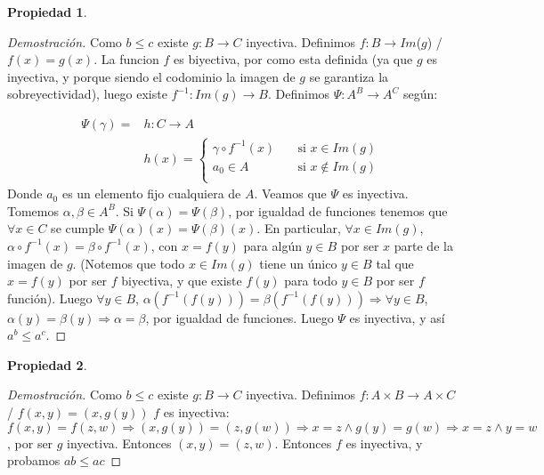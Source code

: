 \documentclass{article}
\newtheorem*{propiedad}{Propiedad}
\begin{document}
\begin{propiedad}
\end{propiedad}
\begin{proof}[Demostración]

Como $b \le c$ existe $g: B \rightarrow C$ inyectiva. \newline Definimos $f: B \rightarrow Im$($g$) / $f(x) = g(x)$. La funcion $f$ es biyectiva, por como esta definida (ya que $g$ es inyectiva, y porque siendo el codominio la imagen de $g$ se garantiza la sobreyectividad), luego existe $f^{-1}: Im(g) \rightarrow B$.  Definimos $\Psi : A^B \rightarrow A^C$ según:

\begin{align*}
\Psi(\gamma) =& h: C \rightarrow A \\
& h(x) = \begin{cases}
    \gamma \circ f^{-1}(x)       & \quad \text{si } x \in Im(g)\\
    a_0 \in A  & \quad \text{si } x \notin Im(g)\\
  \end{cases}
\end{align*}
Donde $a_0$ es un elemento fijo cualquiera de $A$.\newline \newline
Veamos que $\Psi$ es inyectiva. Tomemos $\alpha, \beta \in A^B$. Si $\Psi(\alpha) = \Psi(\beta)$, por igualdad de funciones tenemos que $\forall x \in C$ se cumple $\Psi(\alpha)(x) = \Psi(\beta)(x)$. \newline \newline En particular, $\forall x \in Im(g)$, $\alpha \circ f^{-1}(x)  = \beta \circ f^{-1}(x) $, con $x = f(y)$ para algún $y \in B$ por ser $x$ parte de la imagen de $g$. (Notemos que todo $x \in Im(g)$ tiene un único $y\in B$ tal que $x = f(y)$ por ser $f$ biyectiva, y que existe $f(y)$ para todo $y \in B$ por ser $f$ función).  \newline \newline Luego $\forall y \in B$,  $\alpha(f^{-1}(f(y)))  = \beta(f^{-1}(f(y))) \Rightarrow \forall y \in B$, $\alpha(y)  = \beta(y) \Rightarrow \alpha = \beta$, por igualdad de funciones. Luego $\Psi$ es inyectiva, y así $a^b \le a^c$.
\end{proof}
\newpage
\begin{propiedad}
\end{propiedad}
\begin{proof}[Demostración] 
Como $b \le c$ existe $g: B \rightarrow C$ inyectiva. \newline \newline Definimos $f: A \times B \rightarrow A \times C$ / $f(x,y) = (x, g(y))$ \newline \newline
$f$ es inyectiva: $f(x,y) = f(z,w) \Rightarrow (x, g(y)) = (z, g(w)) \Rightarrow x = z \land g(y) = g(w) \Rightarrow x = z \land y = w$, por ser $g$ inyectiva. Entonces $(x,y) = (z,w)$. \newline Entonces $f$ es inyectiva, y probamos $ab \le ac$\newline

\end{proof}
\end{document}
